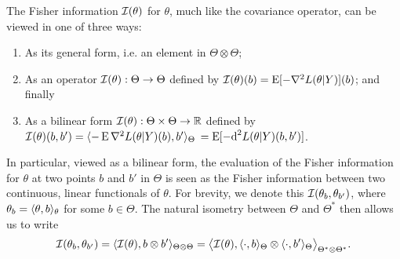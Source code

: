 The Fisher information ${\mathcal I}(\theta)$ for $\theta$, much like the covariance operator, can be viewed in one of three ways: 
\begin{enumerate}
  \item As its general form, i.e. an element in $\Theta\otimes\Theta$;
  \item As an operator ${\mathcal I}(\theta):\Theta\to\Theta$ defined by ${\mathcal I}(\theta)(b) = \operatorname{E}[- \nabla^2 L(\theta|Y)](b)$; and finally
  \item As a bilinear form ${\mathcal I}(\theta):\Theta\times\Theta\to\mathbb{R}$ defined by ${\mathcal I}(\theta)(b,b') = \langle-\operatorname{E} \nabla^2 L(\theta|Y)(b), b'\rangle_\Theta$ $= \operatorname{E} [-\text{d}^2 L(\theta|Y)(b,b') ]$.
\end{enumerate}
In particular, viewed as a bilinear form, the evaluation of the Fisher information for $\theta$ at two points $b$ and $b'$ in $\Theta$ is seen as the Fisher information between two continuous, linear functionals of $\theta$.
For brevity, we denote this ${\mathcal I}(\theta_b,\theta_{b'})$, where $\theta_b = \langle\theta,b\rangle_\theta$ for some $b\in\Theta$.
The natural isometry between $\Theta$ and $\Theta^*$ then allows us to write 
\begin{align}\label{eq:fisher-linear-functional}
  {\mathcal I}(\theta_b,\theta_{b'}) = \langle{\mathcal I}(\theta), b \otimes b'\rangle_{\Theta\otimes\Theta} = \big\langle{\mathcal I}(\theta), \langle\cdot,b\rangle_\Theta \otimes \langle\cdot,b'\rangle_\Theta \big\rangle_{\Theta^*\otimes\Theta^*}.
\end{align}


